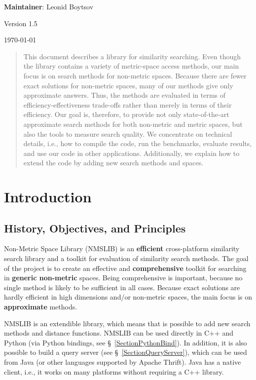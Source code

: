 \documentclass[runningheads,a4paper]{llncs}
\newcommand{\LibVersion}{1.5}
\begin{document}
{\begin{center}{\small \textbf{Maintainer}: Leonid Boytsov}\end{center}}
{\begin{center}{Version \LibVersion}\end{center} 
{\begin{center}{{\today}}\end{center}}

\begin{abstract}
This document describes a library for similarity searching.
Even though the library contains a variety of metric-space access methods,
our main focus is on search methods for non-metric spaces.
Because there are fewer exact solutions for non-metric spaces,
many of our methods give only approximate answers. 
Thus, the methods
are evaluated in terms of efficiency-effectiveness trade-offs
rather than merely in terms of their efficiency.
Our goal is, therefore, to provide
not only state-of-the-art approximate search methods for 
both non-metric and metric spaces,
but also the tools to measure search quality.
We concentrate on technical details, i.e., 
how to compile the code, run the benchmarks, evaluate results,
and use our code in other applications.
Additionally, we explain how to extend the code by adding
new search methods and spaces.
\end{abstract}

\section{Introduction}

\subsection{History, Objectives, and Principles}
Non-Metric Space Library (NMSLIB) is an \textbf{efficient} cross-platform similarity search library and a toolkit for evaluation of similarity search methods.  The goal of the project is to create an effective and \textbf{comprehensive} toolkit for searching in \textbf{generic non-metric} spaces.
Being comprehensive is important, because no single method is likely to be sufficient in all cases.
Because exact solutions are hardly efficient in high dimensions and/or non-metric spaces, the main focus is on \textbf{approximate} methods. 

NMSLIB is an extendible library, which means that is possible to add new search methods and distance functions. 
NMSLIB can be used directly in C++ and Python (via Python bindings, see \S~\ref{SectionPythonBind}). In addition, it is also possible to build a query server (see \S~\ref{SectionQueryServer}), which can be used from Java (or other languages supported by Apache Thrift). Java has a native client, i.e., it works on many platforms without requiring a C++ library.

}
\end{document}
